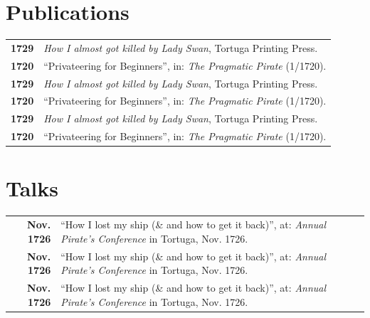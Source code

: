 \documentclass{modernsimplecv}
\newlength{\rightcolwidth}
\begin{document}
\begin{paracol}{2}
{}
\bigskip

\begin{skillsection}{\rightcolwidth}
\end{skillsection}


\bigskip



\vspace{4em}


\begin{minipage}[t]{\rightcolwidth}
\section*{Publications}
\begin{tabular}{>{\footnotesize\bfseries}r >{\footnotesize}p{}}
    1729 & \emph{How I almost got killed by Lady Swan}, Tortuga Printing Press. \\
    1720 & ``Privateering for Beginners'', in: \emph{The Pragmatic Pirate} (1/1720).\\
    1729 & \emph{How I almost got killed by Lady Swan}, Tortuga Printing Press. \\
    1720 & ``Privateering for Beginners'', in: \emph{The Pragmatic Pirate} (1/1720).\\
    1729 & \emph{How I almost got killed by Lady Swan}, Tortuga Printing Press. \\
    1720 & ``Privateering for Beginners'', in: \emph{The Pragmatic Pirate} (1/1720).
\end{tabular}
\bigskip

\section*{Talks}
\begin{tabular}{>{\footnotesize\bfseries}r >{\footnotesize}p{}}
    Nov. 1726 & ``How I lost my ship (\& and how to get it back)'', at: \emph{Annual Pirate's Conference} in Tortuga, Nov. 1726. \\
    Nov. 1726 & ``How I lost my ship (\& and how to get it back)'', at: \emph{Annual Pirate's Conference} in Tortuga, Nov. 1726. \\
    Nov. 1726 & ``How I lost my ship (\& and how to get it back)'', at: \emph{Annual Pirate's Conference} in Tortuga, Nov. 1726.
\end{tabular}
\end{minipage}









\end{paracol}
\end{document}
